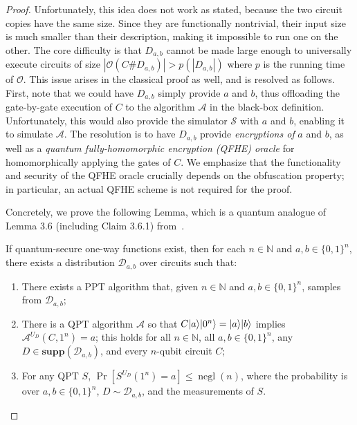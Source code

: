 \documentclass[envcountsame]{llncs}
\numberwithin{equation}{section}
\newcommand{\opn}{\operatorname}
\newcommand{\algo}{\mathcal}
\newcommand{\negl}{\opn{negl}}
\newcommand\supp{\textbf{supp}}
\begin{document}
\begin{proof}
Unfortunately, this idea does not work as stated, because the two circuit copies have the same size. Since they are functionally nontrivial, their input size is much smaller than their description, making it impossible to run one on the other. The core difficulty is that $D_{a,b}$ cannot be made large enough to universally execute circuits of size $|\algo O(C \# D_{a, b})| > p(|D_{a, b}|)$ where $p$ is the running time of $\algo O$. This issue arises in the classical proof as well, and is resolved as follows. First, note that we could have $D_{a, b}$ simply provide $a$ and $b$, thus offloading the gate-by-gate execution of $C$ to the algorithm $\algo A$ in the black-box definition. Unfortunately, this would also provide the simulator $\algo S$ with $a$ and $b$, enabling it to simulate $\algo A$. The resolution is to have $D_{a, b}$ provide \emph{encryptions of} $a$ and $b$, as well as a \emph{quantum fully-homomorphic encryption (QFHE) oracle} for homomorphically applying the gates of $C$. We emphasize that the functionality and security of the QFHE oracle crucially depends on the obfuscation property; in particular, an actual QFHE scheme is not required for the proof.

Concretely, we prove the following Lemma, which is a quantum analogue of Lemma 3.6 (including Claim 3.6.1) from~\cite{BGIRSVY12}.

\begin{lemma}\label{lemma-circuitdistribution}
If quantum-secure one-way functions exist, then for each $n \in \mathbb{N}$ and $a, b\in\{0,1\}^n$, there exists a distribution $\mathcal{D}_{a,b}$ over circuits such that:
\begin{enumerate}
\item There exists a PPT algorithm that, given $n\in\mathbb{N}$ and $a,b\in\{0,1\}^n$, samples from $\mathcal{D}_{a,b}$;
\item There is a QPT algorithm $\algo{A}$ so that $C {\left\vert{a}\right\rangle} {\left\vert{0^n}\right\rangle} = {\left\vert{a}\right\rangle}{\left\vert{b}\right\rangle}$ implies $\algo{A}^{U_D}(C, 1^n) = a$; this holds for all $n \in \mathbb{N}$, all $a,b\in\{0,1\}^n$, any $D\in \supp(\mathcal{D}_{a,b})$, and every $n$-qubit circuit $C$;
\item{For any QPT $S$, $\Pr[S^{U_D}(1^n)=a] \leq \negl(n)$, where the probability is over $a,b\in\{0,1\}^n$, $D\sim \mathcal{D}_{a,b}$, and the measurements of $S$.}	
\end{enumerate}
\end{lemma}


\end{proof}
\end{document}
